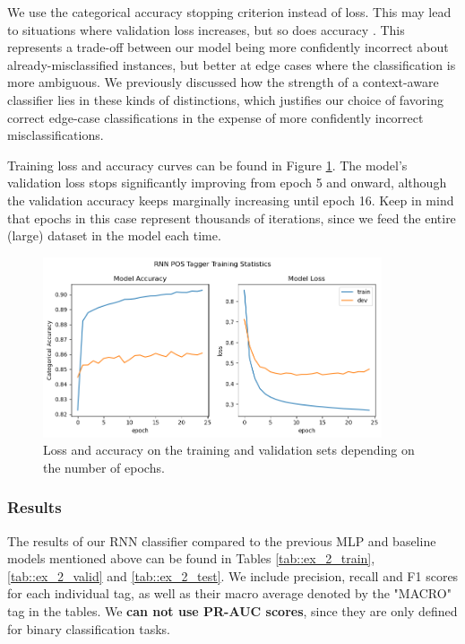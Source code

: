 \documentclass[10pt, a4paper]{article}
\begin{document}
	We use the categorical accuracy stopping criterion instead of loss. This may lead to situations where validation loss increases, but so does accuracy \cite{loss-accuracy}. This represents a trade-off between our model being more confidently incorrect about already-misclassified instances, but better at edge cases where the classification is more ambiguous. We previously discussed how the strength of a context-aware classifier lies in these kinds of distinctions, which justifies our choice of favoring correct edge-case classifications in the expense of more confidently incorrect misclassifications.
	
	Training loss and accuracy curves can be found in Figure \ref{fig::ex_2_fit}. The model's validation loss stops significantly improving from epoch 5 and onward, although the validation accuracy keeps marginally increasing until epoch 16. Keep in mind that epochs in this case represent thousands of iterations, since we feed the entire (large) dataset in the model each time.
	
	\begin{figure}
		\centering
		\includegraphics[width=10cm]{"ex_2_fit.png"}
		\caption{Loss and accuracy on the training and validation sets depending on the number of epochs.}
		\label{fig::ex_2_fit}
	\end{figure}
	
	\subsubsection{Results}
	
	The results of our RNN classifier compared to the previous MLP and baseline models mentioned above can be found in Tables \ref{tab::ex_2_train}, \ref{tab::ex_2_valid} and \ref{tab::ex_2_test}. We include precision, recall and F1 scores for each individual tag, as well as their macro average denoted by the "MACRO" tag in the tables. We \textbf{can not use PR-AUC scores}, since they are only defined for binary classification tasks.
	
\end{document}
